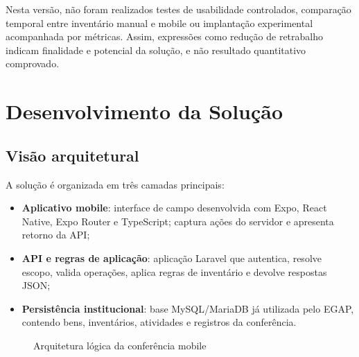 \documentclass[12pt,a4paper]{article}
\begin{document}
Nesta versão, não foram realizados testes de usabilidade controlados,
comparação temporal entre inventário manual e mobile ou implantação
experimental acompanhada por métricas. Assim, expressões como redução de
retrabalho indicam finalidade e potencial da solução, e não resultado
quantitativo comprovado.

\section{Desenvolvimento da Solução}

\subsection{Visão arquitetural}

A solução é organizada em três camadas principais:

\begin{itemize}
  \item \textbf{Aplicativo mobile}: interface de campo desenvolvida com Expo,
  React Native, Expo Router e TypeScript; captura ações do servidor e apresenta
  retorno da API;
  \item \textbf{API e regras de aplicação}: aplicação Laravel que autentica,
  resolve escopo, valida operações, aplica regras de inventário e devolve
  respostas JSON;
  \item \textbf{Persistência institucional}: base MySQL/MariaDB já utilizada
  pelo EGAP, contendo bens, inventários, atividades e registros da conferência.
\end{itemize}

\begin{figure}[H]
\centering
\caption{Arquitetura lógica da conferência mobile}
\label{fig:arquitetura}
\end{figure}
\end{document}
